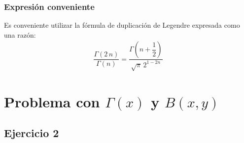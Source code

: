 \documentclass[12pt]{beamer}
\begin{document}
\begin{frame}
\frametitle{Expresión conveniente}
Es conveniente utilizar la fórmula de duplicación de Legendre expresada como una razón:
\pause
\begin{align*}
\dfrac{\Gamma(2 \, n)}{\Gamma (n)} = \dfrac{\Gamma \left( n + \dfrac{1}{2} \right)}{\sqrt{\pi} \, 2^{1- 2n}}
\end{align*}
\end{frame}

\section{Problema con \texorpdfstring{$\Gamma(x)$}{G(x)} y \texorpdfstring{$B(x, y)$}{B(x,y)}}
\subsection{Ejercicio 2}
\end{document}
